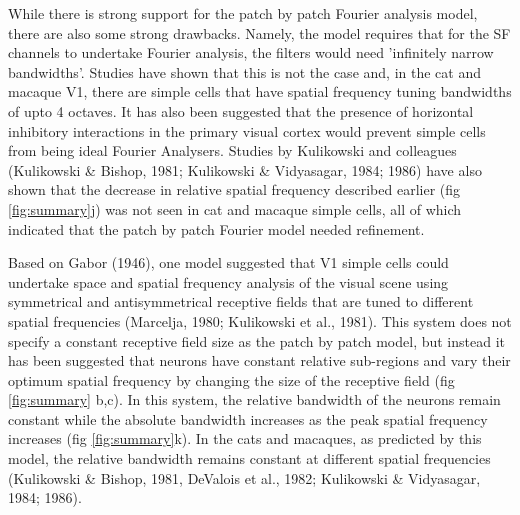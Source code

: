 	While there is strong support for the patch by patch Fourier analysis model, there are also some strong drawbacks. Namely, the model requires that for the SF channels to undertake Fourier analysis, the filters would need 'infinitely narrow bandwidths'. Studies have shown that this is not the case and, in the cat and macaque V1, there are simple cells that have spatial frequency tuning bandwidths of upto 4 octaves. It has also been suggested that the presence of horizontal inhibitory interactions in the primary visual cortex would prevent simple cells from being ideal Fourier Analysers. Studies by Kulikowski and colleagues (Kulikowski \& Bishop, 1981; Kulikowski \& Vidyasagar, 1984; 1986) have also shown that the decrease in relative spatial frequency described earlier (fig \ref{fig:summary}j) was not seen in cat and macaque simple cells, all of which indicated that the patch by patch Fourier model needed refinement.
	
	Based on Gabor (1946), one model suggested that V1 simple cells could undertake space and spatial frequency analysis of the visual scene using symmetrical and antisymmetrical receptive fields that are tuned to different spatial frequencies (Marcelja, 1980; Kulikowski et al., 1981). This system does not specify a constant receptive field size as the patch by patch model, but instead it has been suggested that neurons have constant relative sub-regions and vary their optimum spatial frequency by changing the size of the receptive field (fig \ref{fig:summary} b,c). In this system, the relative bandwidth of the neurons remain constant while the absolute bandwidth increases as the peak spatial frequency increases (fig \ref{fig:summary}k). In the cats and macaques, as predicted by this model, the relative bandwidth remains constant at different spatial frequencies (Kulikowski \& Bishop, 1981, DeValois et al., 1982; Kulikowski \& Vidyasagar, 1984; 1986). 
	
